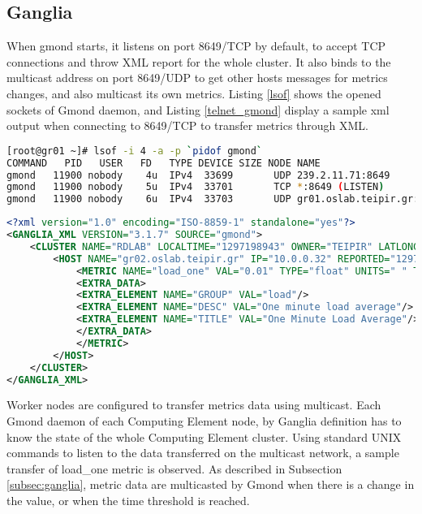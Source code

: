\subsection{Ganglia}

When gmond starts, it listens on port 8649/TCP by default, to accept TCP connections and throw XML report for the whole cluster. It also binds to the multicast address on port 8649/UDP to get other hosts messages for metrics changes, and also multicast its own metrics. Listing \ref{lsof} shows the opened sockets of Gmond daemon, and Listing \ref{telnet_gmond} display a sample xml output when connecting to 8649/TCP to transfer metrics through XML.

\begin{lstlisting}[language=bash,caption=Gmond networking,label=lsof]
[root@gr01 ~]# lsof -i 4 -a -p `pidof gmond`
COMMAND   PID   USER   FD   TYPE DEVICE SIZE NODE NAME
gmond   11900 nobody    4u  IPv4  33699       UDP 239.2.11.71:8649 
gmond   11900 nobody    5u  IPv4  33701       TCP *:8649 (LISTEN)
gmond   11900 nobody    6u  IPv4  33703       UDP gr01.oslab.teipir.gr:39991->239.2.11.71:8649 
\end{lstlisting}

\begin{lstlisting}[language=XML,caption=Gmond XML cluster report,label=telnet_gmond]
<?xml version="1.0" encoding="ISO-8859-1" standalone="yes"?>
<GANGLIA_XML VERSION="3.1.7" SOURCE="gmond">
	<CLUSTER NAME="RDLAB" LOCALTIME="1297198943" OWNER="TEIPIR" LATLONG="unspecified" URL="unspecified">
		<HOST NAME="gr02.oslab.teipir.gr" IP="10.0.0.32" REPORTED="1297198934" TN="8" TMAX="20" DMAX="0" LOCATION="unspecified" GMOND_STARTED="1296569542">
			<METRIC NAME="load_one" VAL="0.01" TYPE="float" UNITS=" " TN="50" TMAX="70" DMAX="0" SLOPE="both">
			<EXTRA_DATA>
			<EXTRA_ELEMENT NAME="GROUP" VAL="load"/>
			<EXTRA_ELEMENT NAME="DESC" VAL="One minute load average"/>
			<EXTRA_ELEMENT NAME="TITLE" VAL="One Minute Load Average"/>
			</EXTRA_DATA>
			</METRIC>
		</HOST>
	</CLUSTER>
</GANGLIA_XML>
\end{lstlisting}

Worker nodes are configured to transfer metrics data using multicast. Each Gmond daemon of each Computing Element node, by Ganglia definition has to know the state of the whole Computing Element cluster. Using standard UNIX commands to listen to the data transferred on the multicast network, a sample transfer of load\_one metric is observed. As described in Subsection \ref{subsec:ganglia}, metric data are multicasted by Gmond when there is a change in the value, or when the time threshold is reached.

